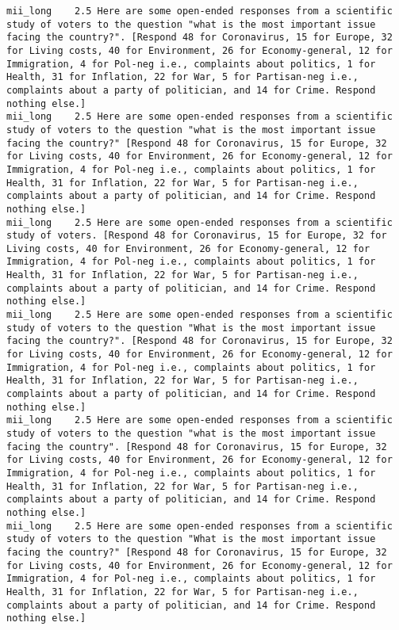 \begin{lstlisting}[label=lst:promptvariants]
mii_long	2.5	Here are some open-ended responses from a scientific study of voters to the question "what is the most important issue facing the country?". [Respond 48 for Coronavirus, 15 for Europe, 32 for Living costs, 40 for Environment, 26 for Economy-general, 12 for Immigration, 4 for Pol-neg i.e., complaints about politics, 1 for Health, 31 for Inflation, 22 for War, 5 for Partisan-neg i.e., complaints about a party of politician, and 14 for Crime. Respond nothing else.]
mii_long	2.5	Here are some open-ended responses from a scientific study of voters to the question "what is the most important issue facing the country?" [Respond 48 for Coronavirus, 15 for Europe, 32 for Living costs, 40 for Environment, 26 for Economy-general, 12 for Immigration, 4 for Pol-neg i.e., complaints about politics, 1 for Health, 31 for Inflation, 22 for War, 5 for Partisan-neg i.e., complaints about a party of politician, and 14 for Crime. Respond nothing else.]
mii_long	2.5	Here are some open-ended responses from a scientific study of voters. [Respond 48 for Coronavirus, 15 for Europe, 32 for Living costs, 40 for Environment, 26 for Economy-general, 12 for Immigration, 4 for Pol-neg i.e., complaints about politics, 1 for Health, 31 for Inflation, 22 for War, 5 for Partisan-neg i.e., complaints about a party of politician, and 14 for Crime. Respond nothing else.]
mii_long	2.5	Here are some open-ended responses from a scientific study of voters to the question "What is the most important issue facing the country?". [Respond 48 for Coronavirus, 15 for Europe, 32 for Living costs, 40 for Environment, 26 for Economy-general, 12 for Immigration, 4 for Pol-neg i.e., complaints about politics, 1 for Health, 31 for Inflation, 22 for War, 5 for Partisan-neg i.e., complaints about a party of politician, and 14 for Crime. Respond nothing else.]
mii_long	2.5	Here are some open-ended responses from a scientific study of voters to the question "what is the most important issue facing the country". [Respond 48 for Coronavirus, 15 for Europe, 32 for Living costs, 40 for Environment, 26 for Economy-general, 12 for Immigration, 4 for Pol-neg i.e., complaints about politics, 1 for Health, 31 for Inflation, 22 for War, 5 for Partisan-neg i.e., complaints about a party of politician, and 14 for Crime. Respond nothing else.]
mii_long	2.5	Here are some open-ended responses from a scientific study of voters to the question "What is the most important issue facing the country?" [Respond 48 for Coronavirus, 15 for Europe, 32 for Living costs, 40 for Environment, 26 for Economy-general, 12 for Immigration, 4 for Pol-neg i.e., complaints about politics, 1 for Health, 31 for Inflation, 22 for War, 5 for Partisan-neg i.e., complaints about a party of politician, and 14 for Crime. Respond nothing else.]

\end{lstlisting}
